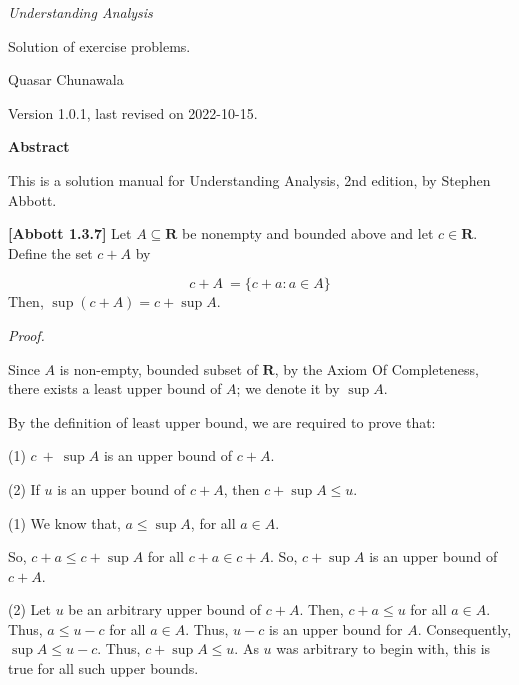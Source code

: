 \documentclass[10pt]{article}
\begin{document}
\begin{center}
{\huge \textit{Understanding Analysis}}

{\Large {Solution of exercise problems.}}

{Quasar Chunawala}

{Version 1.0.1, last revised on 2022-10-15.}



\textbf{{\footnotesize Abstract}}

{\footnotesize This is a solution manual for Understanding Analysis, 2nd edition, by Stephen Abbott. }

\end{center}
\textbf{[Abbott 1.3.7]} Let $\displaystyle A\subseteq \mathbf{R}$ be nonempty and bounded above and let $\displaystyle c\in \mathbf{R}$. Define the set $\displaystyle c+A$ by


\begin{equation*}
c+A\ =\{c+a:a\in A\}
\end{equation*}
Then, $\displaystyle \sup ( c+A) =c+\sup A$.



\textit{Proof.}

Since $\displaystyle A$ is non-empty, bounded subset of $\displaystyle \mathbf{R}$, by the Axiom Of Completeness, there exists a least upper bound of $\displaystyle A$; we denote it by $\displaystyle \sup A$.



By the definition of least upper bound, we are required to prove that:



(1) $\displaystyle c\ +\ \sup A$ is an upper bound of $\displaystyle c+A$.

(2) If $\displaystyle u$ is an upper bound of $\displaystyle c+A$, then $\displaystyle c+\sup A\leq u$.



(1) We know that, $\displaystyle a\leq \sup A$, for all $\displaystyle a\in A$. 

So, $\displaystyle c+a\leq c+\sup A$ for all $\displaystyle c+a\in c+A$. So, $\displaystyle c+\sup A$ is an upper bound of $\displaystyle c+A$.



(2) Let $\displaystyle u$ be an arbitrary upper bound of $\displaystyle c+A$. Then, $\displaystyle c+a\leq u$ for all $\displaystyle a\in A$. Thus, $\displaystyle a\leq u-c$ for all $\displaystyle a\in A$. Thus, $\displaystyle u-c$ is an upper bound for $\displaystyle A$. Consequently, $\displaystyle \sup A\leq u-c$. Thus, $\displaystyle c+\sup A\leq u$. As $\displaystyle u$ was arbitrary to begin with, this is true for all such upper bounds. 
\end{document}
